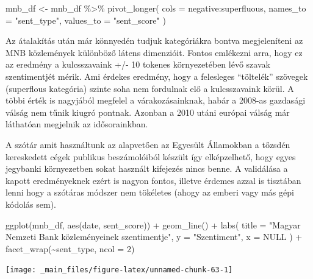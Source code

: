 \documentclass[
]{book}
\newenvironment{Shaded}{\begin{snugshade}}{\end{snugshade}}
\newcommand{\AttributeTok}[1]{\textcolor[rgb]{0.77,0.63,0.00}{#1}}
\newcommand{\ConstantTok}[1]{\textcolor[rgb]{0.00,0.00,0.00}{#1}}
\newcommand{\DecValTok}[1]{\textcolor[rgb]{0.00,0.00,0.81}{#1}}
\newcommand{\FunctionTok}[1]{\textcolor[rgb]{0.00,0.00,0.00}{#1}}
\newcommand{\NormalTok}[1]{#1}
\newcommand{\OtherTok}[1]{\textcolor[rgb]{0.56,0.35,0.01}{#1}}
\newcommand{\SpecialCharTok}[1]{\textcolor[rgb]{0.00,0.00,0.00}{#1}}
\newcommand{\StringTok}[1]{\textcolor[rgb]{0.31,0.60,0.02}{#1}}
\begin{document}
\begin{Shaded}
\begin{Highlighting}[]
\NormalTok{mnb\_df }\OtherTok{\textless{}{-}}\NormalTok{ mnb\_df }\SpecialCharTok{\%\textgreater{}\%}
  \FunctionTok{pivot\_longer}\NormalTok{(}
    \AttributeTok{cols =}\NormalTok{ negative}\SpecialCharTok{:}\NormalTok{superfluous,}
    \AttributeTok{names\_to =} \StringTok{"sent\_type"}\NormalTok{,}
    \AttributeTok{values\_to =} \StringTok{"sent\_score"}
\NormalTok{  )}
\end{Highlighting}
\end{Shaded}

Az átalakítás után már könnyedén tudjuk kategóriákra bontva
megjeleníteni az MNB közlemények különböző látens dimenzióit. Fontos
emlékezni arra, hogy ez az eredmény a kulcsszavaink +/- 10 tokenes
környezetében lévő szavak szentimentjét mérik. Ami érdekes eredmény,
hogy a felesleges ``töltelék'' szövegek (superflous kategória) szinte
soha nem fordulnak elő a kulcsszavaink körül. A többi érték is nagyjából
megfelel a várakozásainknak, habár a 2008-as gazdasági válság nem tűnik
kiugró pontnak. Azonban a 2010 utáni európai válság már láthatóan
megjelnik az idősorainkban.

A szótár amit használtunk az alapvetően az Egyesült Államokban a tőzsdén
kereskedett cégek publikus beszámolóiból készült így elképzelhető, hogy
egyes jegybanki környezetben sokat használt kifejezés nincs benne. A
validálása a kapott eredményeknek ezért is nagyon fontos, illetve
érdemes azzal is tisztában lenni hogy a szótáras módszer nem tökéletes
(ahogy az emberi vagy más gépi kódolás sem).

\begin{Shaded}
\begin{Highlighting}[]
\FunctionTok{ggplot}\NormalTok{(mnb\_df, }\FunctionTok{aes}\NormalTok{(date, sent\_score)) }\SpecialCharTok{+}
  \FunctionTok{geom\_line}\NormalTok{() }\SpecialCharTok{+}
  \FunctionTok{labs}\NormalTok{(}
    \AttributeTok{title =} \StringTok{"Magyar Nemzeti Bank közleményeinek szentimentje"}\NormalTok{,}
    \AttributeTok{y =} \StringTok{"Szentiment"}\NormalTok{,}
    \AttributeTok{x =} \ConstantTok{NULL}
\NormalTok{  ) }\SpecialCharTok{+}
  \FunctionTok{facet\_wrap}\NormalTok{(}\SpecialCharTok{\textasciitilde{}}\NormalTok{sent\_type, }\AttributeTok{ncol =} \DecValTok{2}\NormalTok{)}
\end{Highlighting}
\end{Shaded}

\begin{center}\texttt{[image: \_main\_files/figure-latex/unnamed-chunk-63-1]} \end{center}
\end{document}
